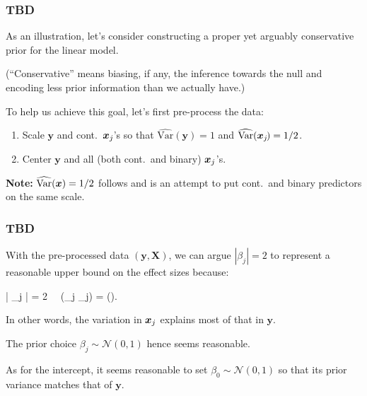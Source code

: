 \documentclass[18pt, handout]{beamer}
\newcommand{\defineTightItemizeSpacing}{%
	\setlength{\abovedisplayskip}{.25\baselineskip}%
	\setlength{\belowdisplayskip}{.25\baselineskip}%
}
\newenvironment{tightEquation*}{%
	\defineTightItemizeSpacing%
	\begin{equation*}
}{
	\end{equation*} \ignorespacesafterend
}
\newenvironment{narrowEnumerate}[1][1.]{%
  \vspace{-.3\baselineskip}%
  \begin{enumerate}[#1]
  \addtolength\itemsep{-.1\baselineskip}
}{
  \end{enumerate}
}
\newcommand{\variance}{\mathrm{Var}}
\newcommand{\normalDist}{\mathcal{N}}
\newcommand{\by}{\bm{y}}
\newcommand{\bX}{\bm{X}}
\begin{document}
\begin{frame}
\frametitle{TBD}
As an illustration, let's consider constructing a proper yet arguably conservative prior for the linear model.

(``Conservative'' means biasing, if any, the inference towards the null and encoding less prior information than we actually have.)

To help us achieve this goal, let's first pre-process the data:
\begin{narrowEnumerate}
  \item Scale $\bm{y}$ and cont.\ $\bm{x}_j\mkern-1mu$'s so that $\widehat{\variance}(\by) = 1$ and $\widehat{\variance}(\bx_j \mkern-2mu) = 1/2$.%
  \item Center $\bm{y}$ and all (both cont.\ and binary) $\bm{x}_j$'s.
\end{narrowEnumerate}

\textbf{Note:} $\widehat{\variance}(\bx) = 1/2$ follows \citet{gelman2008default_prior} and is an attempt to put cont.\ and binary predictors on the same scale. 
\end{frame}


\begin{frame}
\frametitle{TBD}
With the pre-processed data $(\by, \bX)$, we can argue $| \beta_j | = 2$ to represent a reasonable upper bound on the effect sizes because:
\begin{tightEquation*}
| \beta_j | = 2
	\ \Rightarrow \ \widehat{\variance}(\beta_j \bx_j) = \widehat{\variance}(\by).
\end{tightEquation*}
In other words, the variation in $\bm{x}_j$ explains most of that in $\by$. 

The prior choice $\beta_j \sim \normalDist(0, 1)$ hence seems reasonable. %

\smallskip
As for the intercept, it seems reasonable to set $\beta_0 \sim \normalDist(0, 1)$ so that its prior variance matches that of $\by$.

\end{frame}
\end{document}
